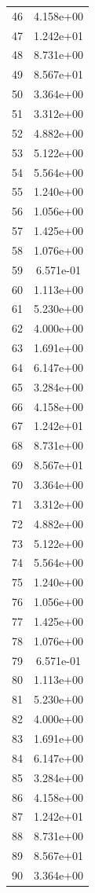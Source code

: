 \documentclass[12pt]{article}
\begin{document}
\begin{longtable}{@{}cc@{}}
46 & 4.158e+00 \\
47 & 1.242e+01 \\
48 & 8.731e+00 \\
49 & 8.567e+01 \\
50 & 3.364e+00 \\
51 & 3.312e+00 \\
52 & 4.882e+00 \\
53 & 5.122e+00 \\
54 & 5.564e+00 \\
55 & 1.240e+00 \\
56 & 1.056e+00 \\
57 & 1.425e+00 \\
58 & 1.076e+00 \\
59 & 6.571e-01 \\
60 & 1.113e+00 \\
61 & 5.230e+00 \\
62 & 4.000e+00 \\
63 & 1.691e+00 \\
64 & 6.147e+00 \\
65 & 3.284e+00 \\
66 & 4.158e+00 \\
67 & 1.242e+01 \\
68 & 8.731e+00 \\
69 & 8.567e+01 \\
70 & 3.364e+00 \\
71 & 3.312e+00 \\
72 & 4.882e+00 \\
73 & 5.122e+00 \\
74 & 5.564e+00 \\
75 & 1.240e+00 \\
76 & 1.056e+00 \\
77 & 1.425e+00 \\
78 & 1.076e+00 \\
79 & 6.571e-01 \\
80 & 1.113e+00 \\
81 & 5.230e+00 \\
82 & 4.000e+00 \\
83 & 1.691e+00 \\
84 & 6.147e+00 \\
85 & 3.284e+00 \\
86 & 4.158e+00 \\
87 & 1.242e+01 \\
88 & 8.731e+00 \\
89 & 8.567e+01 \\
90 & 3.364e+00 \\

\end{longtable}
\end{document}
